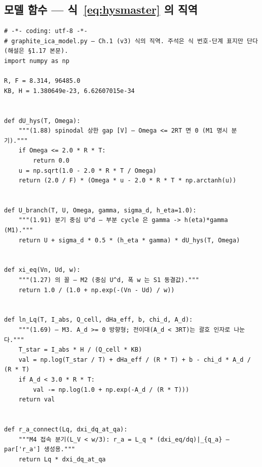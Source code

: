 \documentclass[11pt,a4paper]{article}
\begin{document}
\subsection{모델 함수 — 식~\eqref{eq:hysmaster} 의 직역}\label{sec:codemodel}
\begin{small}
\begin{verbatim}
# -*- coding: utf-8 -*-
# graphite_ica_model.py — Ch.1 (v3) 식의 직역. 주석은 식 번호·단계 표지만 단다(해설은 §1.17 본문).
import numpy as np

R, F = 8.314, 96485.0
KB, H = 1.380649e-23, 6.62607015e-34


def dU_hys(T, Omega):
    """(1.88) spinodal 상한 gap [V] — Omega <= 2RT 면 0 (M1 명시 분기)."""
    if Omega <= 2.0 * R * T:
        return 0.0
    u = np.sqrt(1.0 - 2.0 * R * T / Omega)
    return (2.0 / F) * (Omega * u - 2.0 * R * T * np.arctanh(u))


def U_branch(T, U, Omega, gamma, sigma_d, h_eta=1.0):
    """(1.91) 분기 중심 U^d — 부분 cycle 은 gamma -> h(eta)*gamma (M1)."""
    return U + sigma_d * 0.5 * (h_eta * gamma) * dU_hys(T, Omega)


def xi_eq(Vn, Ud, w):
    """(1.27) 의 꼴 — M2 (중심 U^d, 폭 w 는 S1 동결값)."""
    return 1.0 / (1.0 + np.exp(-(Vn - Ud) / w))


def ln_Lq(T, I_abs, Q_cell, dHa_eff, b, chi_d, A_d):
    """(1.69) — M3. A_d >= 0 방향형; 전이대(A_d < 3RT)는 괄호 인자로 나눈다."""
    T_star = I_abs * H / (Q_cell * KB)
    val = np.log(T_star / T) + dHa_eff / (R * T) + b - chi_d * A_d / (R * T)
    if A_d < 3.0 * R * T:
        val -= np.log(1.0 + np.exp(-A_d / (R * T)))
    return val


def r_a_connect(Lq, dxi_dq_at_qa):
    """M4 접속 분기(L_V < w/3): r_a = L_q * (dxi_eq/dq)|_{q_a} — par['r_a'] 생성용."""
    return Lq * dxi_dq_at_qa



\end{verbatim}
\end{small}
\end{document}
